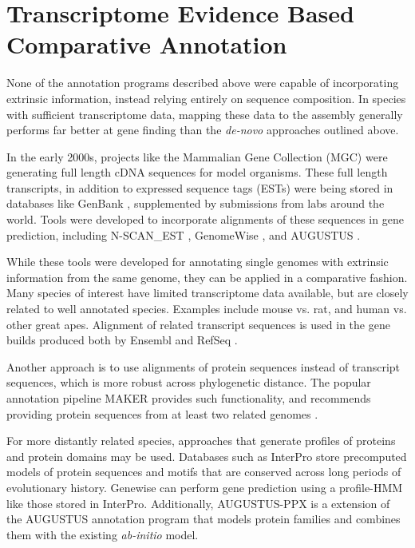 \documentclass[fleqn,10pt]{wlscirep}
\begin{document}
\section*{Transcriptome Evidence Based Comparative Annotation}

None of the annotation programs described above were capable of incorporating extrinsic information, instead relying entirely on sequence composition. In species with sufficient transcriptome data, mapping these data to the assembly generally performs far better at gene finding than the \textit{de-novo} approaches outlined above. 

In the early 2000s, projects like the Mammalian Gene Collection (MGC) \cite{mammalian2002generation} were generating full length cDNA sequences for model organisms. These full length transcripts, in addition to expressed sequence tags (ESTs) were being stored in databases like GenBank \cite{benson2000genbank}, supplemented by submissions from labs around the world. Tools were developed to incorporate alignments of these sequences in gene prediction, including N-SCAN\_EST \cite{wei2006using},  GenomeWise \cite{birney2004genewise}, and AUGUSTUS \cite{stanke2008using}.

While these tools were developed for annotating single genomes with extrinsic information from the same genome, they can be applied in a comparative fashion. Many species of interest have limited transcriptome data available, but are closely related to well annotated species. Examples include mouse vs. rat, and human vs. other great apes. Alignment of related transcript sequences is used in the gene builds produced both by Ensembl \cite{Aken01012016} and RefSeq \cite{pruitt2006ncbi}.

Another approach is to use alignments of protein sequences instead of transcript sequences, which is more robust across phylogenetic distance. The popular annotation pipeline MAKER \cite{cantarel2008maker} provides such functionality, and recommends providing protein sequences from at least two related genomes \cite{yandell2012beginner}. 

For more distantly related species, approaches that generate profiles of proteins and protein domains may be used. Databases such as InterPro \cite{zdobnov2001interproscan} store precomputed models of protein sequences and motifs that are conserved across long periods of evolutionary history. Genewise \cite{birney2004genewise} can perform gene prediction using a profile-HMM like those stored in InterPro. Additionally, AUGUSTUS-PPX \cite{keller2011novel} is a extension of the AUGUSTUS annotation program that models protein families and combines them with the existing \textit{ab-initio} model.
\end{document}
